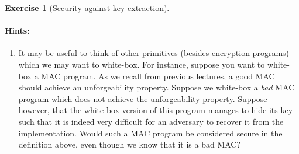 \documentclass[envcountsame,runningheads,notitlepage]{../llncs}
\theoremstyle{definition}
\newtheorem{graded}[crossed]{Exercise}
\begin{document}
\begin{graded}[Security against key extraction]
\paragraph{Hints:}
\begin{enumerate}
\item It may be useful to think of other primitives (besides encryption programs) which we may want to white-box. For instance, suppose you want to white-box a MAC program. As we recall from previous lectures, a good MAC should achieve an unforgeability property. Suppose we white-box a \emph{bad} MAC program which does not achieve the unforgeability property. Suppose however, that the white-box version of this program manages to hide its key such that it is indeed very difficult for an adversary to recover it from the implementation. Would such a MAC program be considered secure in the definition above, even though we know that it is a bad MAC?
\end{enumerate}


\end{graded}
\end{document}
